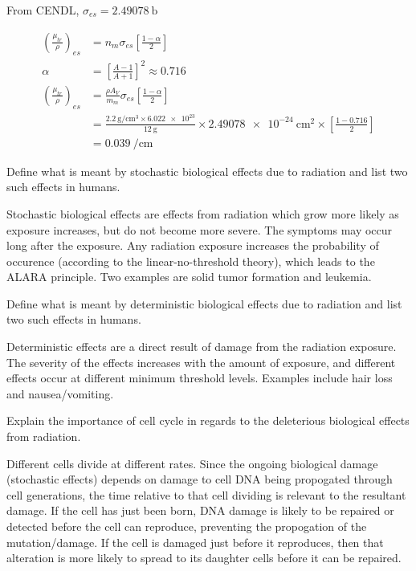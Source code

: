 \documentclass{hw}
\begin{document}
From CENDL, $\sigma_{es}=\SI{2.49078}{\barn}$

\begin{align*}
    \left(\frac{\mu_{tr}}{\rho}\right)_{es} &=
    n_m \sigma_{es} \left[ \frac{1-\alpha}{2} \right] \\
    \alpha &= \left[ \frac{A-1}{A+1} \right]^2 \approx 0.716 \\
    \left(\frac{\mu_{tr}}{\rho}\right)_{es} &= 
    \frac{\rho A_V}{m_m} \sigma_{es} \left[ \frac{1-\alpha}{2} \right] \\
    &= \frac{\SI{2.2}{\gram\per\centi\meter^3} \times \num{6.022e23}}
    {\SI{12}{\gram}} \times \SI{2.49078e-24}{\centi\meter^2} \times 
    \left[ \frac{1-\num{0.716}}{2} \right] \\
    &= \SI{0.039}{\per\centi\meter}
\end{align*}

\problem{}
Define what is meant by stochastic biological effects due to radiation and list 
two such effects in humans.

\solution
Stochastic biological effects are effects from radiation which grow more likely 
as exposure increases, but do not become more severe. The symptoms may occur 
long after the exposure. Any radiation exposure increases the probability of 
occurence (according to the linear-no-threshold theory), which leads to the 
ALARA principle. Two examples are solid tumor formation and leukemia.

\problem{}
Define what is meant by deterministic biological effects due to radiation and 
list two such effects in humans.

\solution
Deterministic effects are a direct result of damage from the radiation 
exposure. The severity of the effects increases with the amount of exposure, 
and different effects occur at different minimum threshold levels. Examples 
include hair loss and nausea/vomiting.

\problem{}
Explain the importance of cell cycle in regards to the deleterious biological 
effects from radiation.

\solution
Different cells divide at different rates. Since the ongoing biological damage 
(stochastic effects) depends on damage to cell DNA being propogated through 
cell generations, the time relative to that cell dividing is relevant to the 
resultant damage. If the cell has just been born, DNA damage is likely to be 
repaired or detected before the cell can reproduce, preventing the propogation 
of the mutation/damage. If the cell is damaged just before it reproduces, 
then that alteration is more likely to spread to its daughter cells before 
it can be repaired.
\end{document}
